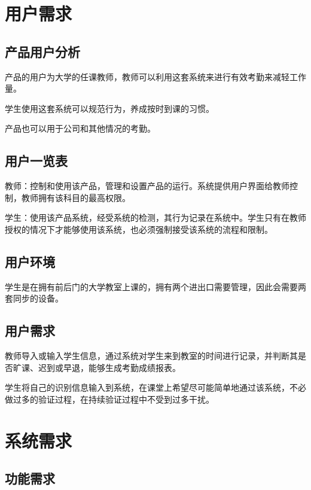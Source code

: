 \documentclass[cs4size,a4paper,nofonts]{ctexart}
\begin{document}
\section{用户需求}

\subsection{产品用户分析}

产品的用户为大学的任课教师，教师可以利用这套系统来进行有效考勤来减轻工作量。

学生使用这套系统可以规范行为，养成按时到课的习惯。

产品也可以用于公司和其他情况的考勤。

\subsection{用户一览表}

教师：控制和使用该产品，管理和设置产品的运行。系统提供用户界面给教师控制，教师拥有该科目的最高权限。

学生：使用该产品系统，经受系统的检测，其行为记录在系统中。学生只有在教师授权的情况下才能够使用该系统，也必须强制接受该系统的流程和限制。

\subsection{用户环境}

学生是在拥有前后门的大学教室上课的，拥有两个进出口需要管理，因此会需要两套同步的设备。

\subsection{用户需求}

教师导入或输入学生信息，通过系统对学生来到教室的时间进行记录，并判断其是否旷课、迟到或早退，能够生成考勤成绩报表。

学生将自己的识别信息输入到系统，在课堂上希望尽可能简单地通过该系统，不必做过多的验证过程，在持续验证过程中不受到过多干扰。

\section{系统需求}

\subsection{功能需求}
\end{document}
